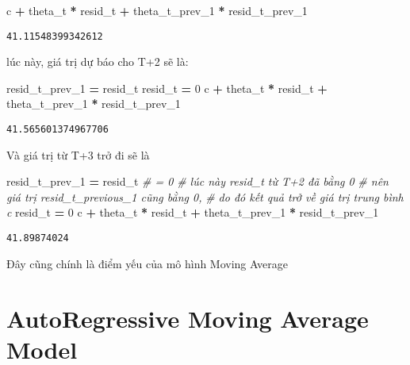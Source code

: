 \documentclass[
]{book}
\newenvironment{Shaded}{\begin{snugshade}}{\end{snugshade}}
\newcommand{\CommentTok}[1]{\textcolor[rgb]{0.56,0.35,0.01}{\textit{#1}}}
\newcommand{\DecValTok}[1]{\textcolor[rgb]{0.00,0.00,0.81}{#1}}
\newcommand{\NormalTok}[1]{#1}
\newcommand{\OperatorTok}[1]{\textcolor[rgb]{0.81,0.36,0.00}{\textbf{#1}}}
\begin{document}
\begin{Shaded}
\begin{Highlighting}[]
\NormalTok{c }\OperatorTok{+}\NormalTok{ theta\_t }\OperatorTok{*}\NormalTok{ resid\_t }\OperatorTok{+}\NormalTok{ theta\_t\_prev\_1 }\OperatorTok{*}\NormalTok{ resid\_t\_prev\_1}
\end{Highlighting}
\end{Shaded}

\begin{verbatim}
41.11548399342612
\end{verbatim}

lúc này, giá trị dự báo cho T+2 sẽ là:

\begin{Shaded}
\begin{Highlighting}[]
\NormalTok{resid\_t\_prev\_1 }\OperatorTok{=}\NormalTok{ resid\_t}
\NormalTok{resid\_t }\OperatorTok{=} \DecValTok{0}
\NormalTok{c }\OperatorTok{+}\NormalTok{ theta\_t }\OperatorTok{*}\NormalTok{ resid\_t }\OperatorTok{+}\NormalTok{ theta\_t\_prev\_1 }\OperatorTok{*}\NormalTok{ resid\_t\_prev\_1}
\end{Highlighting}
\end{Shaded}

\begin{verbatim}
41.565601374967706
\end{verbatim}

Và giá trị từ T+3 trở đi sẽ là

\begin{Shaded}
\begin{Highlighting}[]
\NormalTok{resid\_t\_prev\_1 }\OperatorTok{=}\NormalTok{ resid\_t }\CommentTok{\# = 0}
\CommentTok{\# lúc này resid\_t từ T+2 đã bằng 0 }
\CommentTok{\# nên giá trị resid\_t\_previous\_1 cũng bằng 0, }
\CommentTok{\# do đó kết quả trở về giá trị trung bình c}
\NormalTok{resid\_t }\OperatorTok{=} \DecValTok{0}
\NormalTok{c }\OperatorTok{+}\NormalTok{ theta\_t }\OperatorTok{*}\NormalTok{ resid\_t }\OperatorTok{+}\NormalTok{ theta\_t\_prev\_1 }\OperatorTok{*}\NormalTok{ resid\_t\_prev\_1}
\end{Highlighting}
\end{Shaded}

\begin{verbatim}
41.89874024
\end{verbatim}

Đây cũng chính là điểm yếu của mô hình Moving Average

\section{AutoRegressive Moving Average Model}\label{autoregressive-moving-average-model}
\end{document}
